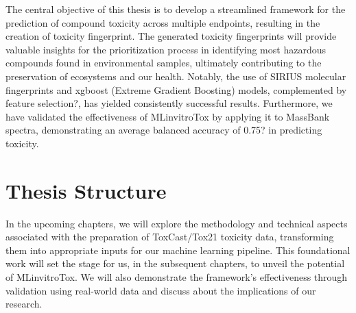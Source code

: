 The central objective of this thesis is to develop a streamlined framework for the prediction of compound toxicity across multiple endpoints, resulting in the creation of toxicity fingerprint. The generated toxicity fingerprints will provide valuable insights for the prioritization process in identifying most hazardous compounds found in environmental samples, ultimately contributing to the preservation of ecosystems and our health. Notably, the use of SIRIUS molecular fingerprints and xgboost (Extreme Gradient Boosting) models, complemented by feature selection?, has yielded consistently successful results. Furthermore, we have validated the effectiveness of MLinvitroTox by applying it to MassBank spectra, demonstrating an average balanced accuracy of 0.75? in predicting toxicity.

\section{Thesis Structure}

In the upcoming chapters, we will explore the methodology and technical aspects associated with the preparation of ToxCast/Tox21 toxicity data, transforming them into appropriate inputs for our machine learning pipeline. This foundational work will set the stage for us, in the subsequent chapters, to unveil the potential of MLinvitroTox. We will also demonstrate the framework's effectiveness through validation using real-world data and discuss about the implications of our research.
